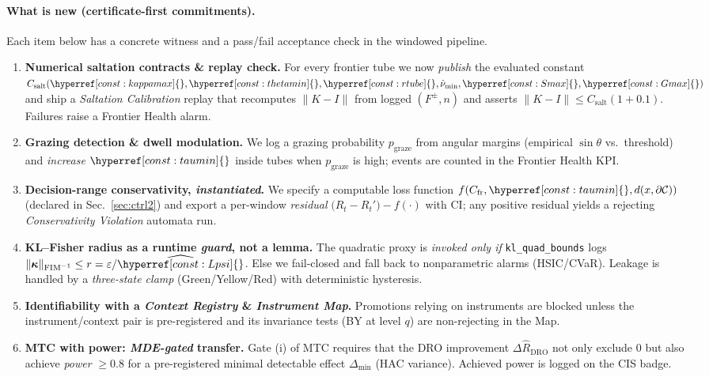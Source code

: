 \documentclass[10pt]{article}
\newcommand{\FIM}{\mathrm{FIM}}
\newcommand{\cutq}{q}
\newcommand{\constref}[1]{\hyperref[const:#1]{\ensuremath{\csname constsym#1\endcsname}}}
\begin{document}
\paragraph{What is new (certificate-first commitments).}
Each item below has a concrete witness and a pass/fail acceptance check in the windowed pipeline.
\begin{enumerate}[leftmargin=*,itemsep=2pt]
\item \textbf{Numerical saltation contracts \& replay check.} For every frontier tube we now \emph{publish} the evaluated constant $C_{\mathrm{salt}}(\constref{kappamax},\constref{thetamin},\constref{rtube},\hat\nu_{\min},\constref{Smax},\constref{Gmax})$ and ship a \emph{Saltation Calibration} replay that recomputes $\|K{-}I\|$ from logged $(F^\pm,n)$ and asserts $\|K{-}I\|\le C_{\mathrm{salt}}(1{+}0.1)$. Failures raise a Frontier Health alarm. 
\item \textbf{Grazing detection \& dwell modulation.} We log a grazing probability $p_{\mathrm{graze}}$ from angular margins (empirical $\sin\theta$ vs.\ threshold) and \emph{increase} $\constref{taumin}$ inside tubes when $p_{\mathrm{graze}}$ is high; events are counted in the Frontier Health KPI.
\item \textbf{Decision-range conservativity, \emph{instantiated}.} We specify a computable loss function $f\!\left(C_{\mathrm{fr}},\constref{taumin},d(x,\partial\mathcal C)\right)$ (declared in Sec.~\ref{sec:ctrl2}) and export a per-window \emph{residual} $\big(R_t{-}R_t'\big)-f(\cdot)$ with CI; any positive residual yields a rejecting \emph{Conservativity Violation} automata run.
\item \textbf{KL--Fisher radius as a runtime \emph{guard}, not a lemma.} The quadratic proxy is \emph{invoked only if} \texttt{kl\_quad\_bounds} logs $\|\bm\kappa\|_{\FIM^{-1}}\le r=\varepsilon/\widehat{\constref{Lpsi}}$. Else we fail-closed and fall back to nonparametric alarms (HSIC/CVaR). Leakage is handled by a \emph{three-state clamp} (Green/Yellow/Red) with deterministic hysteresis.
\item \textbf{Identifiability with a \emph{Context Registry} \& \emph{Instrument Map}.} Promotions relying on instruments are blocked unless the instrument/context pair is pre-registered and its invariance tests (BY at level $\cutq$) are non-rejecting in the Map.
\item \textbf{MTC with power: \emph{MDE-gated} transfer.} Gate (i) of MTC requires that the DRO improvement $\Delta\hat R_{\mathrm{DRO}}$ not only exclude $0$ but also achieve \emph{power} $\ge 0.8$ for a pre-registered minimal detectable effect $\Delta_{\min}$ (HAC variance). Achieved power is logged on the CIS badge.

\end{enumerate}
\end{document}
